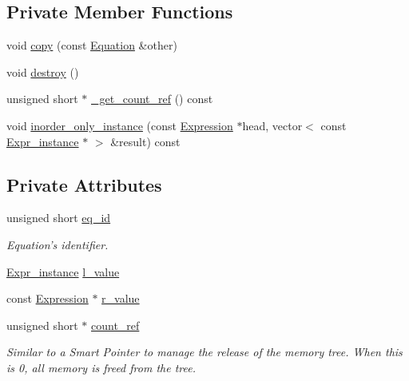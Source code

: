 \subsection*{Private Member Functions}
\begin{CompactItemize}
\item 
void \hyperlink{classgenevalmag_1_1Equation_25cb4f7a1a49ac1d1408fc54e1d1378e}{copy} (const \hyperlink{classgenevalmag_1_1Equation}{Equation} \&other)
\item 
void \hyperlink{classgenevalmag_1_1Equation_3314fa8459cfd0f0316daa6d38a895ee}{destroy} ()
\item 
unsigned short $\ast$ \hyperlink{classgenevalmag_1_1Equation_b900ac60c5c2b4427970f7d68361db20}{\_\-get\_\-count\_\-ref} () const 
\item 
void \hyperlink{classgenevalmag_1_1Equation_34b874554d9ed47d37473ae4dab5d16e}{inorder\_\-only\_\-instance} (const \hyperlink{classgenevalmag_1_1Expression}{Expression} $\ast$head, vector$<$ const \hyperlink{classgenevalmag_1_1Expr__instance}{Expr\_\-instance} $\ast$ $>$ \&result) const 
\end{CompactItemize}
\subsection*{Private Attributes}
\begin{CompactItemize}
\item 
unsigned short \hyperlink{classgenevalmag_1_1Equation_bcf149aeb80efa3ccb5c41886570e215}{eq\_\-id}
\begin{CompactList}\small\item\em Equation's identifier. \item\end{CompactList}\item 
\hyperlink{classgenevalmag_1_1Expr__instance}{Expr\_\-instance} \hyperlink{classgenevalmag_1_1Equation_f6dfdfddb6eff2b61a359ff5d58c5144}{l\_\-value}
\item 
const \hyperlink{classgenevalmag_1_1Expression}{Expression} $\ast$ \hyperlink{classgenevalmag_1_1Equation_bdc49df03becf19ea7f5aa1b89b749c0}{r\_\-value}
\item 
unsigned short $\ast$ \hyperlink{classgenevalmag_1_1Equation_96ea50e0ed15373e6246fd00d8c79ac4}{count\_\-ref}
\begin{CompactList}\small\item\em Similar to a Smart Pointer to manage the release of the memory tree. When this is 0, all memory is freed from the tree. \item\end{CompactList}\end{CompactItemize}


